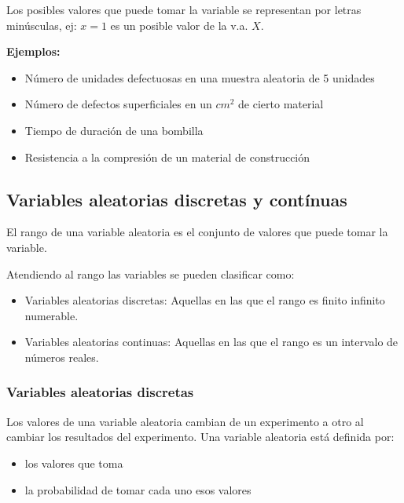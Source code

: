 \documentclass[]{article}
\def\tightlist{}
\numberwithin{equation}{section}
\begin{document}
Los posibles valores que puede tomar la variable se representan por
letras minúsculas, ej: \(x=1\) es un posible valor de la v.a. \(X\).

\textbf{Ejemplos:}

\begin{itemize}
\item
  Número de unidades defectuosas en una muestra aleatoria de 5 unidades
\item
  Número de defectos superficiales en un \(cm^2\) de cierto material
\item
  Tiempo de duración de una bombilla
\item
  Resistencia a la compresión de un material de construcción
\end{itemize}

\subsection{Variables aleatorias discretas y
contínuas}\label{variables-aleatorias-discretas-y-continuas}

El rango de una variable aleatoria es el conjunto de valores que puede
tomar la variable.

Atendiendo al rango las variables se pueden clasificar como:

\begin{itemize}
\tightlist
\item
  Variables aleatorias discretas: Aquellas en las que el rango es finito
  infinito numerable.
\item
  Variables aleatorias continuas: Aquellas en las que el rango es un
  intervalo de números reales.
\end{itemize}

\subsubsection{Variables aleatorias
discretas}\label{variables-aleatorias-discretas}

Los valores de una variable aleatoria cambian de un experimento a otro
al cambiar los resultados del experimento. Una variable aleatoria está
definida por:

\begin{itemize}
\tightlist
\item
  los valores que toma
\item
  la probabilidad de tomar cada uno esos valores
\end{itemize}
\end{document}
